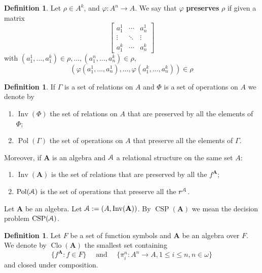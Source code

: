 \documentclass{amsart}
\theoremstyle{plain}
\theoremstyle{definition}
\newtheorem{definition}[theorem]{Definition}
\theoremstyle{remark}
\def\phi{\varphi}
\DeclareMathOperator{\Clo}{Clo}
\DeclareMathOperator{\CSP}{CSP}
\DeclareMathOperator{\Inv}{Inv}
\DeclareMathOperator{\Pol}{Pol}
\begin{document}
\begin{definition}
    Let $\rho \in A^k$, and $\phi: A^n \to A$. 
    We say that $\phi$ \textbf{preserves} $\rho$ if given a matrix 
    \begin{equation*}
        \begin{bmatrix}
          a_1^1 & \cdots & a^1_n \\
          \vdots & \ddots &  \vdots  \\
          a^k_1 & \cdots & a^k_n
          \end{bmatrix}
      \end{equation*}
      with $(a_1^1, \ldots, a^k_1) \in \rho, \ldots, (a_1^n, \ldots, a^k_n) \in \rho$, 
      \begin{equation*}
        (\phi(a_1^1 , \ldots , a^1_n), \ldots, \phi(a^k_1 , \ldots , a^k_n)) \in \rho
      \end{equation*}
\end{definition}

\begin{definition}
    If $\Gamma$ is a set of relations on $A$ and $\Phi$ is a set of operations on $A$ we denote by 
    \begin{enumerate}
        \item $\Inv(\Phi)$ the set of relations on $A$ that are preserved by all the elements of $\Phi$; 
        \item $\Pol(\Gamma)$ the set of operations on $A$ that preserve all the elements of $\Gamma$. 
    \end{enumerate}
    Moreover, if $\mathbf{A}$ is an algebra and $\EuScript{A}$ a relational structure on the same set $A$: 
    \begin{enumerate}
        \item $\Inv(\mathbf{A})$ is the set of relations that are preserved by all the $f^{\mathbf{A}}$;
        \item $\Pol(\EuScript{A})$ is the set of operations that preserve all the $r^{\EuScript{A}}$. 
    \end{enumerate} 
\end{definition}

Let $\mathbf{A}$ be an algebra. 
Let $\EuScript{A}:=(A, \Inv(\mathbf{A}))$. 
By $\CSP(\mathbf{A})$ we mean the decision problem $\CSP(\EuScript{A})$. 

\begin{definition}
    Let $F$ be a set of function symbols and $\mathbf{A}$ be an algebra over $F$. 
    We denote by $\Clo(\mathbf{A})$ the smallest set containing 
    \begin{equation*}
        \{f^\mathbf{A}: f \in F\} \quad \text{ and } \quad \{\pi^n_i: A^n \to A, 1 \le i \le n, n \in \omega\}
    \end{equation*}
and closed under composition. 
\end{definition}
\end{document}
